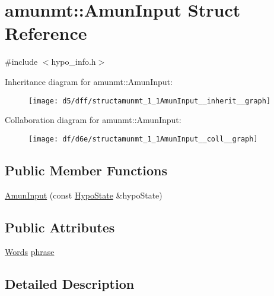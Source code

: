\hypertarget{structamunmt_1_1AmunInput}{}\section{amunmt\+:\+:Amun\+Input Struct Reference}
\label{structamunmt_1_1AmunInput}


{\ttfamily \#include $<$hypo\+\_\+info.\+h$>$}



Inheritance diagram for amunmt\+:\+:Amun\+Input\+:
\nopagebreak
\begin{figure}[H]
\begin{center}
\leavevmode
\texttt{[image: d5/dff/structamunmt\_1\_1AmunInput\_\_inherit\_\_graph]}
\end{center}
\end{figure}


Collaboration diagram for amunmt\+:\+:Amun\+Input\+:
\nopagebreak
\begin{figure}[H]
\begin{center}
\leavevmode
\texttt{[image: df/d6e/structamunmt\_1\_1AmunInput\_\_coll\_\_graph]}
\end{center}
\end{figure}
\subsection*{Public Member Functions}
\begin{DoxyCompactItemize}
\item 
\hyperlink{structamunmt_1_1AmunInput_ad63dd5ec074a95efd4a3de375f0127c1}{Amun\+Input} (const \hyperlink{structamunmt_1_1HypoState}{Hypo\+State} \&hypo\+State)
\end{DoxyCompactItemize}
\subsection*{Public Attributes}
\begin{DoxyCompactItemize}
\item 
\hyperlink{namespaceamunmt_aa50d0b3a5ba58ba5da8a4d88ddab1b18}{Words} \hyperlink{structamunmt_1_1AmunInput_ab2873cdff4f744eb3e39fbc4ece4ae08}{phrase}
\end{DoxyCompactItemize}


\subsection{Detailed Description}


